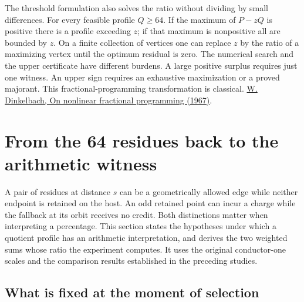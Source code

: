 \documentclass[12pt,letterpaper]{article}
\begin{document}
The threshold formulation also solves the ratio without dividing by small differences. For every feasible profile \(Q\ge64\). If the maximum of \(P-zQ\) is positive there is a profile exceeding \(z\); if that maximum is nonpositive all are bounded by \(z\). On a finite collection of vertices one can replace \(z\) by the ratio of a maximizing vertex until the optimum residual is zero. The numerical search and the upper certificate have different burdens. A large positive surplus requires just one witness. An upper sign requires an exhaustive maximization or a proved majorant. This fractional-programming transformation is classical. \href{https://doi.org/10.1287/mnsc.13.7.492}{W. Dinkelbach, On nonlinear fractional programming (1967)}.
\section{From the 64 residues back to the arithmetic witness}
\label{sec:arithmetic-transport}

A pair of residues at distance \(s\) can be a geometrically allowed edge while neither endpoint is retained on the host. An odd retained point can incur a charge while the fallback at its orbit receives no credit. Both distinctions matter when interpreting a percentage. This section states the hypotheses under which a quotient profile has an arithmetic interpretation, and derives the two weighted sums whose ratio the experiment computes. It uses the original conductor-one scales and the comparison results established in the preceding studies.

\subsection{What is fixed at the moment of selection}
\end{document}
